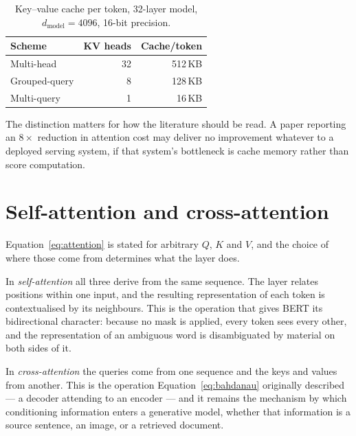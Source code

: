 \documentclass[11pt,a4paper]{article}
\begin{document}
\begin{table}[htbp]
  \centering
  \caption{Key--value cache per token, 32-layer model, $d_{\text{model}} = 4096$,
           16-bit precision.}
  \label{tab:kvcache}
  \begin{tabular}{lrr}
    \toprule
    \textbf{Scheme} & \textbf{KV heads} & \textbf{Cache/token} \\
    \midrule
    Multi-head \cite{vaswani2017}   & 32 & 512\,KB \\
    Grouped-query \cite{ainslie2023} & 8 & 128\,KB \\
    Multi-query \cite{shazeer2019}  & 1  & 16\,KB  \\
    \bottomrule
  \end{tabular}
\end{table}

The distinction matters for how the literature should be read. A paper
reporting an $8\times$ reduction in attention cost may deliver no improvement
whatever to a deployed serving system, if that system's bottleneck is cache
memory rather than score computation.

\section{Self-attention and cross-attention}
\label{sec:cross}

Equation~\ref{eq:attention} is stated for arbitrary $Q$, $K$ and $V$, and the
choice of where those come from determines what the layer does.

In \emph{self-attention} all three derive from the same sequence. The layer
relates positions within one input, and the resulting representation of each
token is contextualised by its neighbours. This is the operation that gives
BERT \cite{devlin2019} its bidirectional character: because no mask is applied,
every token sees every other, and the representation of an ambiguous word is
disambiguated by material on both sides of it.

In \emph{cross-attention} the queries come from one sequence and the keys and
values from another. This is the operation Equation~\ref{eq:bahdanau}
originally described --- a decoder attending to an encoder --- and it remains
the mechanism by which conditioning information enters a generative model,
whether that information is a source sentence, an image, or a retrieved
document.
\end{document}
